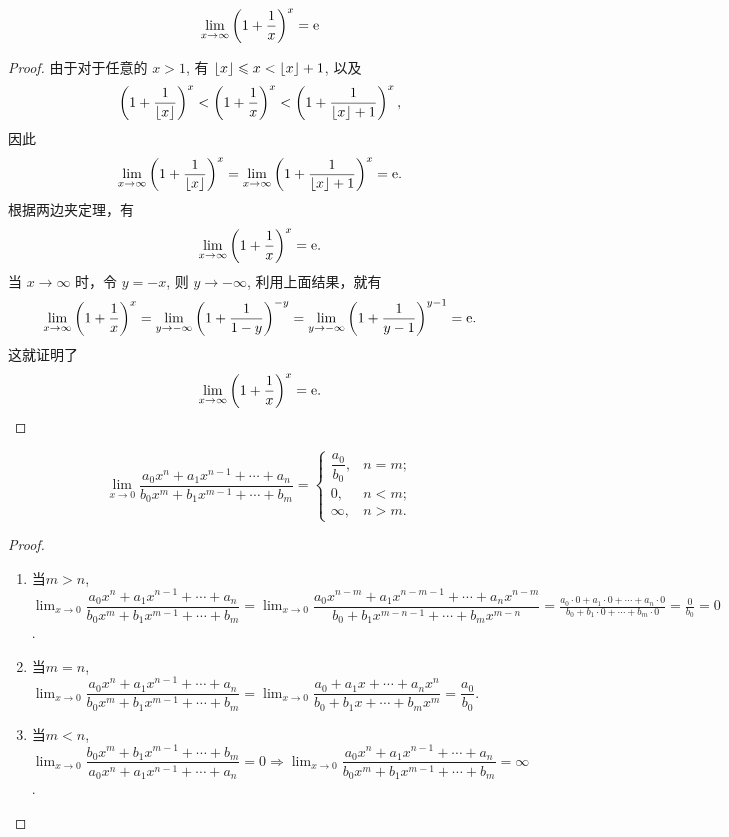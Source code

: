\begin{proposition}
    $$\lim _{x \to \infty} \left(1+\frac 1x \right)^x = \e$$
\end{proposition}

\begin{proof}
    由于对于任意的 $x > 1$, 有 $\llfloor x \rrfloor \les x < \llfloor x \rrfloor + 1$, 以及
    $$
        \left( 1 + \frac{1}{\llfloor x \rrfloor} \right)^x < \left( 1 + \frac{1}{x} \right)^x < \left( 1 + \frac{1}{\llfloor x \rrfloor + 1} \right)^x,
    $$
    因此
    $$
        \lim_{x \to \infty} \left( 1 + \frac{1}{\llfloor x \rrfloor} \right)^x = \lim_{x \to \infty} \left( 1 + \frac{1}{\llfloor x \rrfloor + 1} \right)^x = \e.
    $$
    根据两边夹定理，有
    $$
        \lim_{x \to \infty} \left( 1 + \frac{1}{x} \right)^x = \e.
    $$
    当 $x \to \infty$ 时，令 $y = -x$, 则 $y \to -\infty$, 利用上面结果，就有
    $$
        \lim_{x \to \infty} \left( 1 + \frac{1}{x} \right)^x = \lim_{y \to -\infty} \left( 1 + \frac{1}{1 - y} \right)^{-y} = \lim_{y \to -\infty} \left( 1 + \frac{1}{y - 1} \right)^{y - 1} = \e.
    $$
    这就证明了
    $$
        \lim_{x \to \infty} \left( 1 + \frac{1}{x} \right)^x = \e.$$
\end{proof}

\begin{proposition}
    $$\lim _{x \to 0} \dfrac{a_0 x ^n + a_1 x^{n-1} + \cdots + a_n}{b_0 x^m + b_1 x^{m-1} + \cdots + b_m} = \begin{cases}
            \dfrac{a_0}{b_0}, & n=m; \\
            0,                & n<m; \\
            \infty,           & n>m.
        \end{cases}$$
\end{proposition}

\begin{proof}
    \begin{enumerate}
        \item 当$m >n$,$\lim_{x \to 0} \dfrac{a_0 x ^n + a_1 x^{n-1} + \cdots + a_n}{b_0 x^m + b_1 x^{m-1} + \cdots + b_m} = \lim_{x \to 0} \dfrac{a_0 x ^{n-m} + a_1 x^{n-m-1} + \cdots + a_n x^{n-m}}{b_0 + b_1 x^{m-n-1} + \cdots + b_m x^{m-n}} = \frac{a_0 \cdot 0 + a_1 \cdot 0 + \cdots + a_n \cdot 0}{b_0 + b_1 \cdot 0 + \cdots + b_m \cdot 0} = \frac{0}{b_0} = 0$.
        \item 当$m =n$,$\lim_{x \to 0} \dfrac{a_0 x ^n + a_1 x^{n-1} + \cdots + a_n}{b_0 x^m + b_1 x^{m-1} + \cdots + b_m} = \lim_{x \to 0} \dfrac{a_0 + a_1 x + \cdots + a_n x^n}{b_0 + b_1 x + \cdots + b_m x^m} = \dfrac{a_0}{b_0}$.
        \item 当$m <n$,$\lim_{x \to 0} \dfrac{b_0 x^m + b_1 x^{m-1} + \cdots + b_m}{a_0 x ^n + a_1 x^{n-1} + \cdots + a_n} = 0 \Rightarrow \lim_{x \to 0} \dfrac{a_0 x ^n + a_1 x^{n-1} + \cdots + a_n}{b_0 x^m + b_1 x^{m-1} + \cdots + b_m} = \infty$.
    \end{enumerate}
\end{proof}

